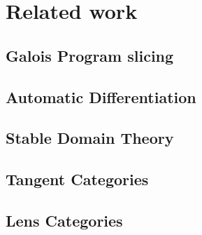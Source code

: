 \section{Related work}

\subsection{Galois Program slicing}

\subsection{Automatic Differentiation}

\subsection{Stable Domain Theory}

\cite{berry79,berry82}

\subsection{Tangent Categories}

\cite{cockett14,cockett18}

\subsection{Lens Categories}

\cite{spivak19}
